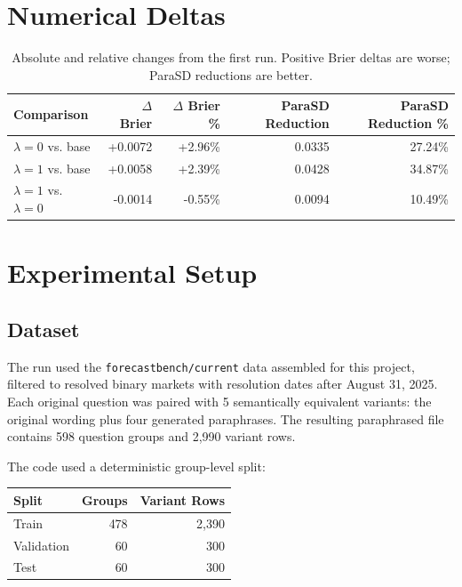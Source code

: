 \documentclass[11pt]{article}
\begin{document}
\section*{Numerical Deltas}

\begin{table}[h!]
\centering
\renewcommand{\arraystretch}{1.2}
\begin{tabular}{lrrrr}
\rowcolor{headerblue}
\color{white}\textbf{Comparison} &
\color{white}\textbf{$\Delta$ Brier} &
\color{white}\textbf{$\Delta$ Brier \%} &
\color{white}\textbf{ParaSD Reduction} &
\color{white}\textbf{ParaSD Reduction \%} \\
\midrule
$\lambda=0$ vs. base & +0.0072 & +2.96\% & 0.0335 & 27.24\% \\
$\lambda=1$ vs. base & +0.0058 & +2.39\% & 0.0428 & 34.87\% \\
$\lambda=1$ vs. $\lambda=0$ & -0.0014 & -0.55\% & 0.0094 & 10.49\% \\
\bottomrule
\end{tabular}
\caption{Absolute and relative changes from the first run. Positive Brier deltas are worse; ParaSD reductions are better.}
\end{table}

\section*{Experimental Setup}

\subsection*{Dataset}

The run used the \texttt{forecastbench/current} data assembled for this project,
filtered to resolved binary markets with resolution dates after August 31, 2025.
Each original question was paired with 5 semantically equivalent variants: the
original wording plus four generated paraphrases. The resulting paraphrased file
contains 598 question groups and 2,990 variant rows.

The code used a deterministic group-level split:

\begin{center}
\begin{tabular}{lrr}
\toprule
\textbf{Split} & \textbf{Groups} & \textbf{Variant Rows} \\
\midrule
Train & 478 & 2,390 \\
Validation & 60 & 300 \\
Test & 60 & 300 \\
\bottomrule
\end{tabular}
\end{center}
\end{document}
